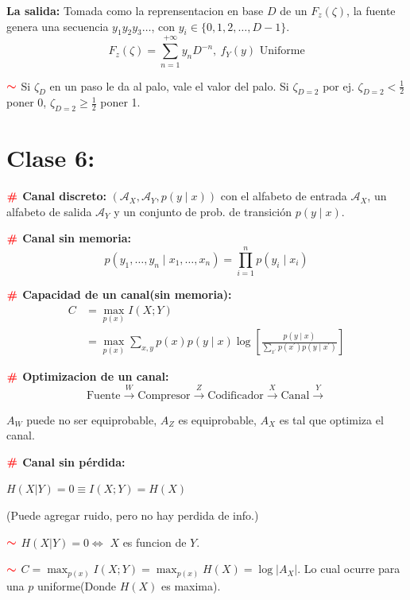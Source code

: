 \documentclass[%
 reprint,
 amsmath,amssymb,
 aps,
]{revtex4-1}
\begin{document}
\textbf{La salida:} 
Tomada como la reprensentacion en base $D$ de un $F_z(\zeta )$, la fuente genera una secuencia $y_{1} y_{2} y_{3} \ldots$, con $y_{i} \in\{0,1,2, \ldots, D-1\}$.
$$
F_z(\zeta )=\sum_{n=1}^{+\infty} y_{n} D^{-n}, 
\ f_Y (y) \text{ Uniforme}
$$ 

\textbf{$\textcolor{red}{\color{red}{\boldsymbol{\sim}}}$} Si $\zeta_D$ en un paso le da al palo, vale el valor del palo.
Si $\zeta_{D=2}$ por ej. $\zeta_{D=2}< \frac{1}{2}$ poner 0, $\zeta_{D=2} \geq \frac{1}{2}$ poner 1.


\section{Clase 6:}

\textbf{$\color{red}{\textbf{\#}}$ Canal discreto:} 
$\left(\mathcal{A}_{X}, \mathcal{A}_{Y}, p(y \mid x)\right)$ con el alfabeto de entrada $\mathcal{A}_{X}$, un alfabeto de salida $\mathcal{A}_{Y}$ y un conjunto de prob. de transición $p(y \mid x)$.

\textbf{$\color{red}{\textbf{\#}}$ Canal sin memoria:} 
$$
p\left(y_{1}, \ldots, y_{n} \mid x_{1}, \ldots, x_{n}\right)=\prod_{i=1}^{n} p\left(y_{i} \mid x_{i}\right)
$$

\textbf{$\color{red}{\textbf{\#}}$ Capacidad de un canal(sin memoria):}
$$
\begin{aligned}
C &=\operatorname{max}_{p(x)} I(X ; Y) \\
&=\operatorname{max}_{p(x)} \sum_{x, y} p(x) p(y \mid x) \log \left[\frac{p(y \mid x)}{\sum_{x^{\prime}} p\left(x^{\prime}\right) p\left(y \mid x^{\prime}\right)}\right]
\end{aligned}
$$

\textbf{$\color{red}{\textbf{\#}}$ Optimizacion de un canal:}
$$\boxed{\text{Fuente}} \stackrel{W}{\rightarrow}
\boxed{\text{Compresor}} \stackrel{Z}{\rightarrow}
\boxed{\text{Codificador}} \stackrel{X}{\rightarrow}
\boxed{\text{Canal}} \stackrel{Y}{\rightarrow}$$

$A_W$ puede no ser equiprobable, $A_Z$ es equiprobable, $A_X$ es tal que optimiza el canal.

\textbf{$\color{red}{\textbf{\#}}$ Canal sin pérdida:} 

$H(X|Y)=0 \equiv I(X;Y)=H(X)$ 

(Puede agregar ruido, pero no hay perdida de info.)

\textbf{$\textcolor{red}{\color{red}{\boldsymbol{\sim}}}$} 
$H(X|Y)=0 \Leftrightarrow$ $X$ es funcion de $Y$.
 
\textbf{$\textcolor{red}{\color{red}{\boldsymbol{\sim}}}$} 
$C =\operatorname{max}_{p(x)} I(X ; Y)= \operatorname{max}_{p(x)}H(X)=\log|A_X|$. Lo cual ocurre para una $p$ uniforme(Donde $H(X)$ es maxima).
\end{document}
